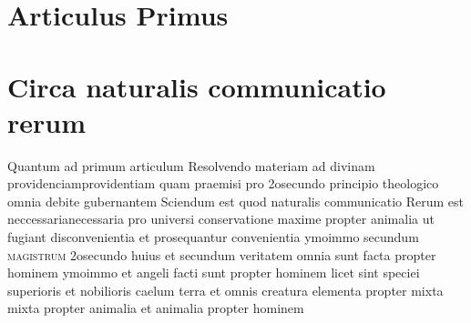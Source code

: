 \documentclass[twoside, openright]{report}
\newcommand{\name}[1]{\textsc{#1}}
\begin{document}
        \bigskip
         \section*{Articulus Primus} 
        \bigskip
         \section*{Circa naturalis communicatio rerum} 
        \pstart
        Quantum ad primum articulum Resolvendo materiam ad divinam providenciamprovidentiam quam praemisi pro 2osecundo principio theologico omnia debite gubernantem Sciendum est quod naturalis communicatio Rerum est neccessarianecessaria pro universi conservatione maxime propter animalia ut fugiant disconvenientia et prosequantur convenientia ymoimmo secundum \name{magistrum}\index[persons]{} 2osecundo huius et secundum veritatem omnia sunt facta propter hominem  ymoimmo et angeli facti sunt propter hominem licet sint speciei superioris et nobilioris  caelum terra et omnis creatura elementa propter mixta  mixta propter animalia et animalia propter hominem
        \pend
     
\end{document}
